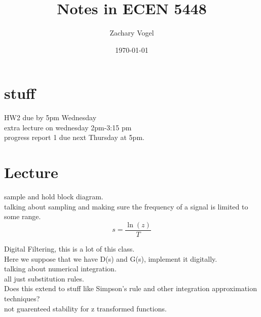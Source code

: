 \documentclass{article}
\author{Zachary Vogel}
\date{\today}
\title{Notes in ECEN 5448}
\begin{document}
\maketitle


\section*{stuff}
HW2 due by 5pm Wednesday\\
extra lecture on wednesday 2pm-3:15 pm\\
progress report 1 due next Thursday at 5pm.\\

\section*{Lecture}
sample and hold block diagram.\\
talking about sampling and making sure the frequency of a signal is limited to some range.
\[s=\frac{\ln (z)}{T}\]


Digital Filtering, this is a lot of this class.\\
Here we suppose that we have D(s) and G(s), implement it digitally.\\
talking about numerical integration.\\
all just substitution rules.\\

Does this extend to stuff like Simpson's rule and other integration approximation techniques?\\

not guarenteed stability for z transformed functions.\\
\end{document}
